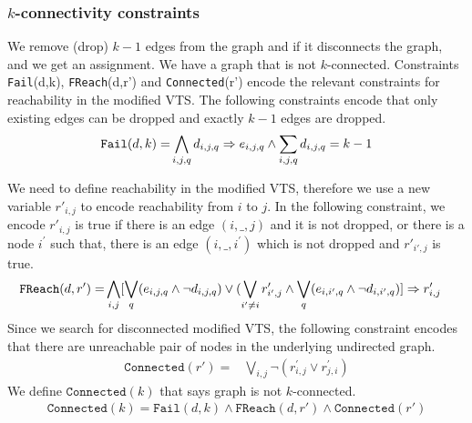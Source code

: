 \subsubsection{$k$-connectivity constraints}
We remove (drop) $k-1$ edges from the graph and if it
disconnects the graph, and we get an assignment. We have a graph that is not  $k$-connected.
%
Constraints \texttt{Fail}(d,k), \texttt{FReach}(d,r') and \texttt{Connected}(r')
encode the relevant constraints for reachability
in the modified VTS. 
%
The following constraints encode that only
existing edges can be dropped and exactly $k-1$ edges are dropped.
\begin{align*}
\texttt{Fail}(d,k) = & 
\bigwedge\limits_{i,j,q} d_{i,j,q} \Rightarrow e_{i,j,q}  \land 
\sum_{i,j,q} d_{i,j,q} = k-1\\
\end{align*}

%
We need to define reachability in the modified VTS, therefore we use
a new variable $r'_{i,j}$ to encode reachability from $i$ to $j$.
In the following constraint, we encode $r'_{i,j}$ is true if there is an
edge $(i,\_,j)$ and it is not dropped, or there is a node
$i^{\prime}$ such that, there is an edge $(i,\_,i^{\prime})$ which is
not dropped and $r'_{i',j}$ is true.
\begin{align*}
\texttt{FReach}(d,r') = &  \bigwedge\limits_{i,j}  [\bigvee_{q} (e_{i,j,q} \land  \neg d_{i,j,q}) \lor  (\bigvee_{i' \neq i}  r^{\prime}_{i',j} \land  \bigvee_{q} (e_{i,i',q} \land \neg d_{i,i',q}) ] \Rightarrow r^{\prime}_{i,j}  
\end{align*}
Since we search for disconnected modified VTS,
the following constraint encodes that there are 
unreachable pair of nodes in the underlying undirected graph.
\begin{align*}
   \texttt{Connected}(r')  = & \bigvee\limits_{i,j} \neg (r^{\prime}_{i,j} \lor r^{\prime}_{j,i})
\end{align*}
We define $\texttt{Connected}(k)$ that says graph is not $k$-connected.
\begin{align*}
\texttt{Connected}(k) = \texttt{Fail}(d,k) \land \texttt{FReach}(d,r') \land \texttt{Connected}(r') 
\end{align*}


